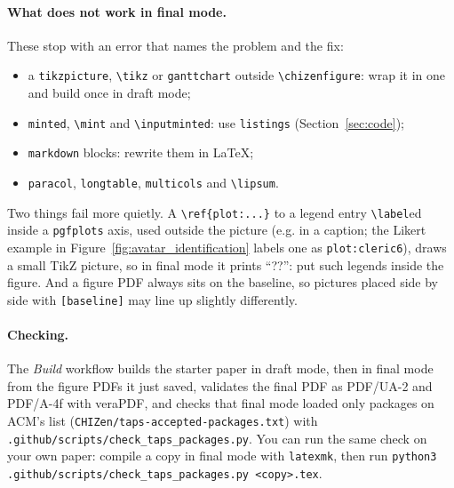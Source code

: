 \paragraph{What does not work in final mode.} These stop with an error that names the problem and the fix:
\begin{itemize}
    \item a \texttt{tikzpicture}, \texttt{\textbackslash tikz} or \texttt{ganttchart} outside \texttt{\textbackslash chizenfigure}: wrap it in one and build once in draft mode;
    \item \texttt{minted}, \texttt{\textbackslash mint} and \texttt{\textbackslash inputminted}: use \texttt{listings} (Section~\ref{sec:code});
    \item \texttt{markdown} blocks: rewrite them in \LaTeX;
    \item \texttt{paracol}, \texttt{longtable}, \texttt{multicols} and \texttt{\textbackslash lipsum}.
\end{itemize}
Two things fail more quietly. A \texttt{\textbackslash ref\{plot:...\}} to a legend entry \texttt{\textbackslash label}ed inside a \texttt{pgfplots} axis, used outside the picture (e.g. in a caption; the Likert example in Figure~\ref{fig:avatar_identification} labels one as \texttt{plot:cleric6}), draws a small TikZ picture, so in final mode it prints ``??'': put such legends inside the figure. And a figure PDF always sits on the baseline, so pictures placed side by side with \texttt{[baseline]} may line up slightly differently.

\paragraph{Checking.} The \emph{Build} workflow builds the starter paper in draft mode, then in final mode from the figure PDFs it just saved, validates the final PDF as PDF/UA-2 and PDF/A-4f with veraPDF, and checks that final mode loaded only packages on ACM's list (\texttt{CHIZen/taps-accepted-packages.txt}) with \texttt{.github/scripts/check\_taps\_packages.py}. You can run the same check on your own paper: compile a copy in final mode with \texttt{latexmk}, then run \texttt{python3 .github/scripts/check\_taps\_packages.py <copy>.tex}.
